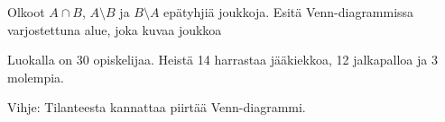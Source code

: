 \begin{tehtavasivu}
\begin{tehtava}
     Olkoot $A \cap B$, $A \setminus B$ ja $B \setminus A$ epätyhjiä joukkoja. Esitä Venn-diagrammissa varjostettuna alue, joka kuvaa joukkoa
    \begin{alakohdat}
    \end{alakohdat}

%
    
\end{tehtava}



\begin{tehtava}
     Luokalla on 30 opiskelijaa. Heistä 14 harrastaa jääkiekkoa, 12 jalkapalloa ja 3 molempia. 
    \begin{alakohdat}
    \end{alakohdat}
Vihje: Tilanteesta kannattaa piirtää Venn-diagrammi.
    \begin{vastaus}
    

\end{vastaus}
\end{tehtava}
\end{tehtavasivu}
